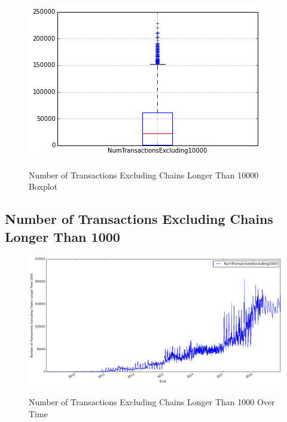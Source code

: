 \begin{figure}[bth]
  \myfloatalign
  {\includegraphics[width=1\linewidth]
    {gfx/n-transactions-excluding-chains-longer-than-10000-boxplot}}
  \caption{Number of Transactions Excluding Chains Longer Than 10000
    Boxplot}
  \label{fig:n-transactions-excluding-chains-longer-than-10000-boxplot}
\end{figure}

\clearpage

\subsection{Number of Transactions Excluding Chains Longer Than 1000}
\label{sec:n-transactions-excluding-chains-longer-than-1000}

\begin{figure}[bth]
  \myfloatalign
  {\includegraphics[width=1\linewidth]
    {gfx/n-transactions-excluding-chains-longer-than-1000-over-time}}
  \caption{Number of Transactions Excluding Chains Longer Than 1000
    Over Time}
  \label{fig:n-transactions-excluding-chains-longer-than-1000-over-time}
\end{figure}

